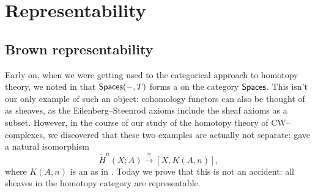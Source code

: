 
\chapter{Representability}\label{RepChap}





\section{Brown representability}

Early on, when we were getting used to the categorical approach to homotopy theory, we noted in  that $\mathsf{Spaces}(-, T)$ forms a  on the category $\mathsf{Spaces}$.
This isn't our only example of such an object: cohomology functors can also be thought of as sheaves, as the Eilenberg--Steenrod axioms include the sheaf axioms as a subset.
However, in the course of our study of the homotopy theory of CW--complexes, we discovered that these two examples are actually not separate:  gave a natural isomorphism \[\widetilde H^n(X; A) \xrightarrow\cong [X, K(A, n)],\] where $K(A, n)$ is an  as in .
Today we prove that this is not an accident: all sheaves in the homotopy category are representable.

